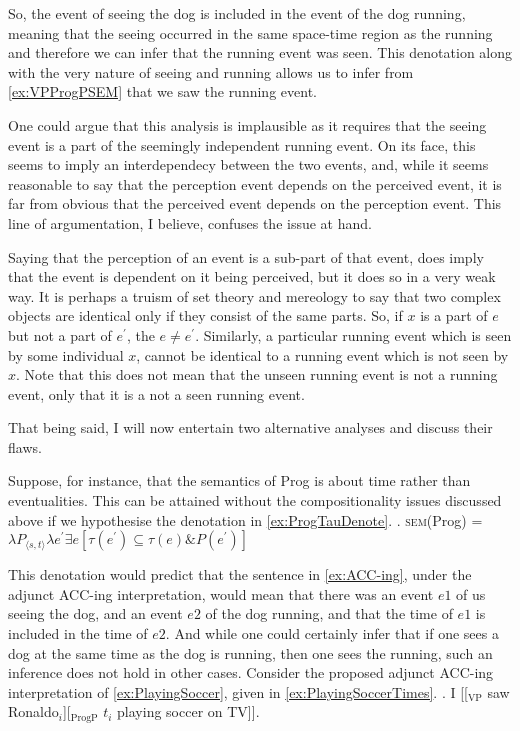 \documentclass[MilwayThesis]{subfiles}
\begin{document}
So, the event of seeing the dog is included in the event of the dog running, meaning that the seeing occurred in the same space-time region as the running and therefore we can infer that the running event was seen.
This denotation along with the very nature of seeing and running allows us to infer from \cref{ex:VPProgPSEM} that we saw the running event.

One could argue that this analysis is implausible as it requires that the seeing event is a part of the seemingly independent running event.
On its face, this seems to imply an interdependecy between the two events, and, while it seems reasonable to say that the perception event depends on the perceived event, it is far from obvious that the perceived event depends on the perception event.
This line of argumentation, I believe, confuses the issue at hand.

Saying that the perception of an event is a sub-part of that event, does imply that the event is dependent on it being perceived, but it does so in a very weak way.
It is perhaps a truism of set theory and mereology to say that two complex objects are identical only if they consist of the same parts.
So, if $x$ is a part of $e$ but not a part of $e^{\prime}$, the $e \neq e^{\prime}$.
Similarly, a particular running event which is seen by some individual $x$, cannot be identical to a running event which is not seen by $x$.
Note that this does not mean that the unseen running event is not a running event, only that it is a not a seen running event.

That being said, I will now entertain two alternative analyses and discuss their flaws.

Suppose, for instance, that the semantics of Prog is about time rather than eventualities.
This can be attained without the compositionality issues discussed above if we hypothesise the denotation in \cref{ex:ProgTauDenote}.
\ex.\label{ex:ProgTauDenote} \textsc{sem}(Prog) = $\lambda P_{\langle s,t\rangle} \lambda e^{\prime} \exists e [\tau(e^{\prime}) \subseteq \tau(e) \& P(e^{\prime})]$

This denotation would predict that the sentence in \cref{ex:ACC-ing}, under the adjunct ACC-ing interpretation, would mean that there was an event $e1$ of us seeing the dog, and an event $e2$ of the dog running, and that the time of $e1$ is included in the time of $e2$.
And while one could certainly infer that if one sees a dog at the same time as the dog is running, then one sees the running, such an inference does not hold in other cases.
Consider the proposed adjunct ACC-ing interpretation of \cref{ex:PlayingSoccer}, given in \cref{ex:PlayingSoccerTimes}.
\ex.\label{ex:PlayingSoccer} I [[$_{\text{VP}}$ saw Ronaldo$_{i}$][$_{\text{ProgP}}$ $t_{i}$ playing soccer on TV]].
\end{document}
